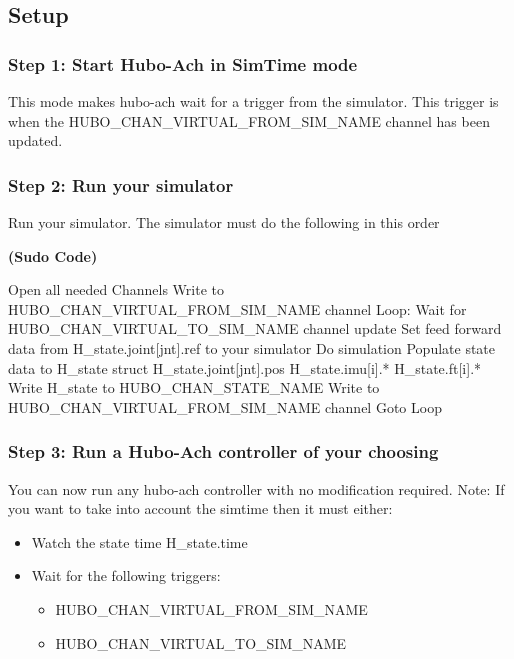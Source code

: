 \subsection{Setup}

\subsubsection{Step 1: Start Hubo-Ach in SimTime mode}

This mode makes hubo-ach wait for a trigger from the simulator. This trigger is when the HUBO\_CHAN\_VIRTUAL\_FROM\_SIM\_NAME channel has been updated.


\subsubsection{Step 2: Run your simulator}

Run your simulator. The simulator must do the following in this order


\footnotesize
\noindent \textbf{(Sudo Code)}
\vspace{-6mm}
\begin{code}
Open all needed Channels
Write to HUBO_CHAN_VIRTUAL_FROM_SIM_NAME channel
Loop:
    Wait for HUBO_CHAN_VIRTUAL_TO_SIM_NAME channel update
    Set feed forward data from H_state.joint[jnt].ref to your simulator
    Do simulation
    Populate state data to H_state struct
        H_state.joint[jnt].pos
        H_state.imu[i].*
        H_state.ft[i].*
    Write H_state to HUBO_CHAN_STATE_NAME
    Write to HUBO_CHAN_VIRTUAL_FROM_SIM_NAME channel
    Goto Loop
\end{code}
\normalsize




\subsubsection{Step 3: Run a Hubo-Ach controller of your choosing}

You can now run any hubo-ach controller with no modification required. Note: If you want to take into account the simtime then it must either:
\begin{itemize}
	\item Watch the state time H\_state.time
	\item Wait for the following triggers:
	\begin{itemize}
		\item HUBO\_CHAN\_VIRTUAL\_FROM\_SIM\_NAME
		\item HUBO\_CHAN\_VIRTUAL\_TO\_SIM\_NAME
	\end{itemize}
\end{itemize}



